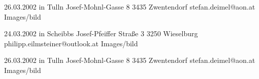 
\begin{Diplomandenvorstellung}

		  {26.03.2002 in Tulln}
		  {Josef-Mohnl-Gasse 8}
		  {3435 Zwentendorf}
		  {
		  }
		  {stefan.deimel@aon.at}
		  {Images/bild}
\newpage	  

		  {24.03.2002 in Scheibbs}
		  {Josef-Pfeiffer Straße 3}
		  {3250 Wieselburg}
		  {
		  }
		  {philipp.eilmsteiner@outlook.at}
		  {Images/bild}
\newpage

		  {26.03.2002 in Tulln}
		  {Josef-Mohnl-Gasse 8}
		  {3435 Zwentendorf}
		  {
		  }
		  {stefan.deimel@aon.at}
		  {Images/bild}
		  
\end{Diplomandenvorstellung}


